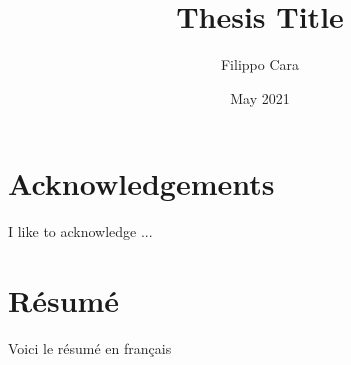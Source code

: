 \documentclass[twoside,12pt,a4paper]{book}
\title{Thesis Title}
\author{Filippo Cara}
\date{May 2021}
\begin{document}
\maketitle

\dominitoc

\chapter*{Acknowledgements}

I like to acknowledge ...


  
\chapter*{Résumé}

Voici le résumé en français

\listoffigures
{}

\listoftables
{}


\printnomenclature

\tableofcontents




\setcounter{mtc}{3}


\setcounter{mtc}{4}


\setcounter{mtc}{5}


\setcounter{mtc}{6}


\setcounter{mtc}{7}







\appendix


% 
\end{document}
